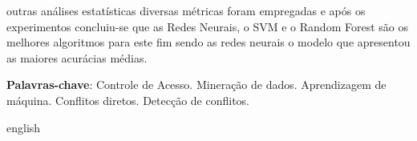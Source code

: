 \documentclass[
	12pt,				%
	openright,			%
	oneside,			%
	a4paper,			%
	english,			%
	french,				%
	spanish,			%
	brazil				%
	]{abntex2}
\begin{document}
\begin{resumo}
outras análises estatísticas diversas métricas foram empregadas e após os experimentos concluiu-se que as Redes Neurais, o SVM e o Random Forest são os melhores algoritmos para este fim sendo as redes neurais o modelo que apresentou as maiores acurácias médias.

 \textbf{Palavras-chave}: Controle de Acesso. Mineração de dados. Aprendizagem de máquina. Conflitos diretos. Detecção de conflitos.
\end{resumo}

\begin{resumo}[Abstract]
 \begin{otherlanguage*}{english}

\end{otherlanguage*}
\end{resumo}
\end{document}
